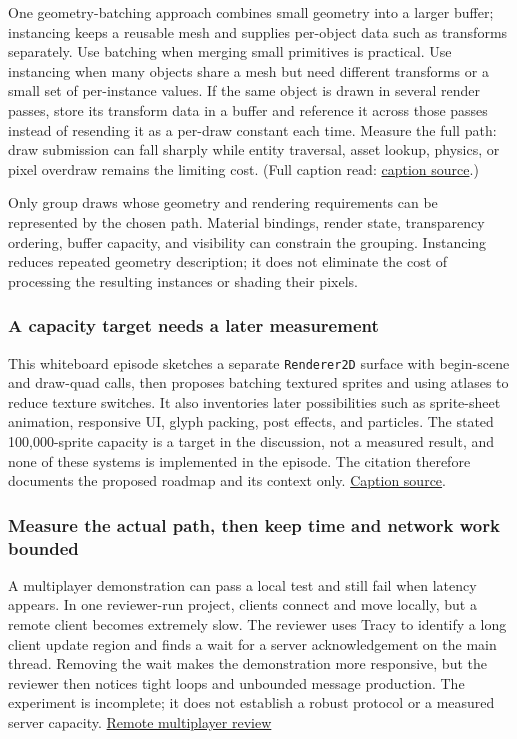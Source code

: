One geometry-batching approach combines small geometry into a larger buffer; instancing keeps a reusable mesh and supplies per-object data such as transforms separately. Use batching when merging small primitives is practical. Use instancing when many objects share a mesh but need different transforms or a small set of per-instance values. If the same object is drawn in several render passes, store its transform data in a buffer and reference it across those passes instead of resending it as a per-draw constant each time. Measure the full path: draw submission can fall sharply while entity traversal, asset lookup, physics, or pixel overdraw remains the limiting cost. (Full caption read: \href{https://www.youtube.com/watch?v=81uFrHwhQg4}{caption source}.)

Only group draws whose geometry and rendering requirements can be represented by the chosen path. Material bindings, render state, transparency ordering, buffer capacity, and visibility can constrain the grouping. Instancing reduces repeated geometry description; it does not eliminate the cost of processing the resulting instances or shading their pixels.

\subsubsection{A capacity target needs a later measurement}\label{06-engine-ii-ch026-a-capacity-target-needs-a-later-measurement}

This whiteboard episode sketches a separate \texttt{Renderer2D} surface with begin-scene and draw-quad calls, then proposes batching textured sprites and using atlases to reduce texture switches. It also inventories later possibilities such as sprite-sheet animation, responsive UI, glyph packing, post effects, and particles. The stated 100,000-sprite capacity is a target in the discussion, not a measured result, and none of these systems is implemented in the episode. The citation therefore documents the proposed roadmap and its context only. \href{https://www.youtube.com/watch?v=ULO8JhM9FsQ}{Caption source}.

\subsubsection{Measure the actual path, then keep time and network work bounded}\label{06-engine-ii-ch026-measure-the-actual-path-then-keep-time-and-network-work-bounded}

A multiplayer demonstration can pass a local test and still fail when latency appears. In one reviewer-run project, clients connect and move locally, but a remote client becomes extremely slow. The reviewer uses Tracy to identify a long client update region and finds a wait for a server acknowledgement on the main thread. Removing the wait makes the demonstration more responsive, but the reviewer then notices tight loops and unbounded message production. The experiment is incomplete; it does not establish a robust protocol or a measured server capacity. \href{https://www.youtube.com/watch?v=lAXOmE481j4&t=17m3s}{Remote multiplayer review}

